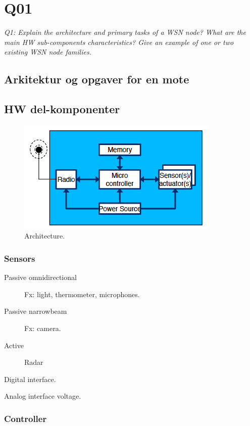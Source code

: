 \chapter{Q01}
\emph{Q1: Explain the architecture and primary tasks of a WSN node? What are
the main HW sub-components characteristics? Give an example of one or two
existing WSN node families.}

\section{Arkitektur og opgaver for en mote}

\section{HW del-komponenter}

\begin{figure}[h]
  \centering
  \includegraphics[scale=0.5]{img/moteAnatomy.png}
  \caption{Architecture.}
\end{figure}

\subsection{Sensors}
\begin{description}
\item[Passive omnidirectional] Fx: light, thermometer, microphones.
\item[Passive narrowbeam] Fx: camera.
\item[Active] Radar
\end{description}

\begin{description}
\item Digital interface.
\item Analog interface voltage.
\end{description}

\subsection{Controller}

